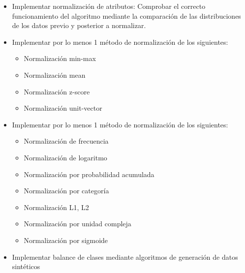 \begin{itemize}
	\item Implementar normalización de atributos: Comprobar el correcto funcionamiento del algoritmo mediante la comparación de las distribuciones de los datos previo y posterior a normalizar.
	\item Implementar por lo menos 1 método de normalización de los siguientes:
	\begin{itemize}
		\item Normalización min-max
		\item Normalización mean
		\item Normalización z-score
		\item Normalización unit-vector
	\end{itemize}
	\item Implementar por lo menos 1 método de normalización de los siguientes:
	\begin{itemize}
		\item Normalización de frecuencia
		\item Normalización de logaritmo
		\item Normalización por probabilidad acumulada
		\item Normalización por categoría
		\item Normalización L1, L2
		\item Normalización por unidad compleja
		\item Normalización por sigmoide
	\end{itemize}
	\item Implementar balance de clases mediante algoritmos de generación de datos sintéticos
\end{itemize}
